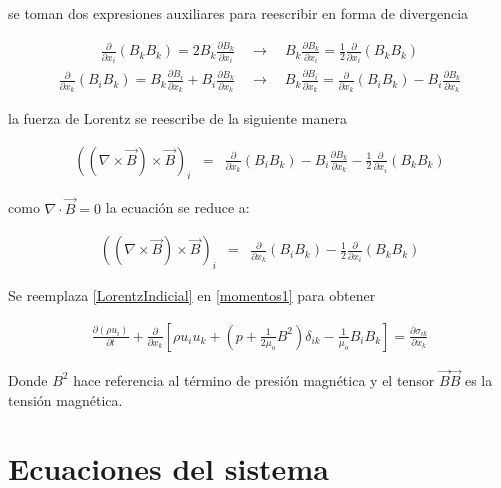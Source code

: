 \noindent se toman dos expresiones auxiliares para reescribir en forma de divergencia


    \begin{eqnarray}
    \frac{\partial}{\partial x_{i}}(B_{k}B_{k}) = 2B_{k}\frac{\partial B_{k}}{\partial x_{i}}\quad\longrightarrow\quad \boxed{B_{k}\frac{\partial B_{k}}{\partial x_{i}} = \frac{1}{2}\frac{\partial}{\partial x_{i}}(B_{k}B_{k})}
    \end{eqnarray}
    \begin{eqnarray}
    \frac{\partial}{\partial x_{k}}(B_{i}B_{k}) = B_{k}\frac{\partial B_{i}}{\partial x_{k}} + B_{i}\frac{\partial B_{k}}{\partial x_{k}} \quad\longrightarrow\quad \boxed{B_{k}\frac{\partial B_{i}}{\partial x_{k}}=\frac{\partial}{\partial x_{k}}(B_{i}B_{k})-B_{i}\frac{\partial B_{k}}{\partial x_{k}}}
    \end{eqnarray}

\noindent la fuerza de Lorentz se reescribe de la siguiente manera

\begin{eqnarray}
\left((\nabla\times\vec{B})\times\vec{B}\right)_{i} &=& \frac{\partial}{\partial x_{k}}(B_{i}B_{k})-B_{i}\frac{\partial B_{k}}{\partial x_{k}}-\frac{1}{2}\frac{\partial}{\partial x_{i}}(B_{k}B_{k})\nonumber 
\end{eqnarray}

\noindent como $\nabla\cdot\vec{B} = 0$ la ecuación se reduce a:

\begin{eqnarray}
\label{LorentzIndicial}
\left((\nabla\times\vec{B})\times\vec{B}\right)_{i} &=& \frac{\partial}{\partial x_{k}}(B_{i}B_{k})-\frac{1}{2}\frac{\partial}{\partial x_{i}}(B_{k}B_{k}) 
\end{eqnarray}

Se reemplaza \eqref{LorentzIndicial} en \eqref{momentos1} para obtener

\begin{eqnarray}
\boxed{\frac{\partial(\rho u_{i})}{\partial t}+\frac{\partial}{\partial x_{k}}\left[\rho u_{i}u_{k}+\left(p+\frac{1}{2\mu_{o}}B^{2}\right)\delta_{ik}-\frac{1}{\mu_{o}}B_{i}B_{k}\right] = \frac{\partial \sigma_{ik}}{\partial x_{k}}}
\end{eqnarray}

Donde $B^{2}$ hace referencia al término de presión magnética y el tensor $\vec{B}\vec{B}$ es la tensión magnética. 

\section{Ecuaciones del sistema}

